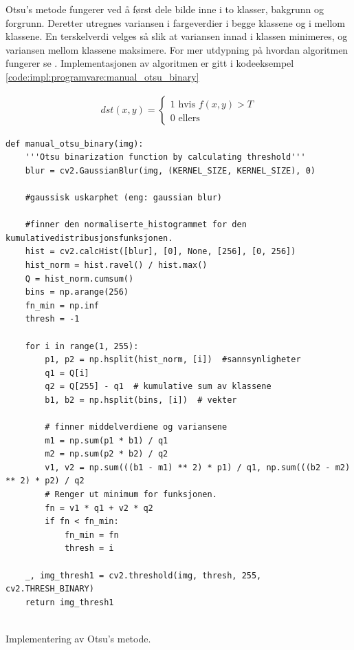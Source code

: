 
Otsu's metode fungerer ved å først dele bilde inne i to klasser, bakgrunn og forgrunn. 
Deretter utregnes variansen i fargeverdier i begge klassene og i mellom klassene. 
En terskelverdi velges så slik at variansen innad i klassen minimeres, og variansen mellom klassene maksimere. 
For mer utdypning på hvordan algoritmen fungerer se \cite{otsu}.
Implementasjonen av algoritmen er gitt i kodeeksempel \ref{code:impl:programvare:manual_otsu_binary}


\begin{align}
    dst(x,y)= \begin{cases} 
     1 \text{ hvis } f(x,y) > T\\
               0 \text{ ellers}
   \end{cases}\label{Binarization}
\end{align}



\begin{listing}[!htb]
\begin{verbatim}
def manual_otsu_binary(img):
    '''Otsu binarization function by calculating threshold'''
    blur = cv2.GaussianBlur(img, (KERNEL_SIZE, KERNEL_SIZE), 0)  
    
    #gaussisk uskarphet (eng: gaussian blur)

    #finner den normaliserte_histogrammet for den kumulativedistribusjonsfunksjonen.
    hist = cv2.calcHist([blur], [0], None, [256], [0, 256])
    hist_norm = hist.ravel() / hist.max()
    Q = hist_norm.cumsum()
    bins = np.arange(256)
    fn_min = np.inf
    thresh = -1

    for i in range(1, 255):
        p1, p2 = np.hsplit(hist_norm, [i])  #sannsynligheter 
        q1 = Q[i]
        q2 = Q[255] - q1  # kumulative sum av klassene
        b1, b2 = np.hsplit(bins, [i])  # vekter 
        
        # finner middelverdiene og variansene
        m1 = np.sum(p1 * b1) / q1
        m2 = np.sum(p2 * b2) / q2
        v1, v2 = np.sum(((b1 - m1) ** 2) * p1) / q1, np.sum(((b2 - m2) ** 2) * p2) / q2
        # Renger ut minimum for funksjonen. 
        fn = v1 * q1 + v2 * q2
        if fn < fn_min:
            fn_min = fn
            thresh = i

    _, img_thresh1 = cv2.threshold(img, thresh, 255, cv2.THRESH_BINARY)
    return img_thresh1
    
\end{verbatim}
\caption{Implementering av Otsu's metode. }
\label{code:impl:programvare:manual_otsu_binary}
\end{listing}


